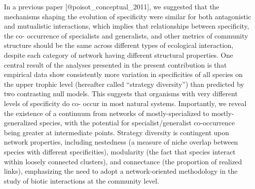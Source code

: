 In a previous paper [@poisot_conceptual_2011], we suggested that the
mechanisms shaping the evolution of specificity were similar for both
antagonistic and mutualistic interactions, which implies that relationships
between specificity, the co- occurrence of specialists and generalists, and
other metrics of community structure should be the same across different
types of ecological interaction, despite each category of network having
different structural properties. One central result of the analyses presented
in the present contribution is that empirical data show consistently more
variation in specificities of all species on the upper trophic level
(hereafter called “strategy diversity”) than predicted by two
contrasting null models. This suggests that organisms with very different
levels of specificity do co- occur in most natural systems. Importantly,
we reveal the existence of a continuum from networks of mostly-specialized
to mostly-generalized species, with the potential for specialist/generalist
co-occurrence being greater at intermediate points. Strategy diversity is
contingent upon network properties, including nestedness (a measure of niche
overlap between species with different specificities), modularity (the fact
that species interact within loosely connected clusters), and connectance (the
proportion of realized links), emphasizing the need to adopt a network-oriented
methodology in the study of biotic interactions at the community level.
